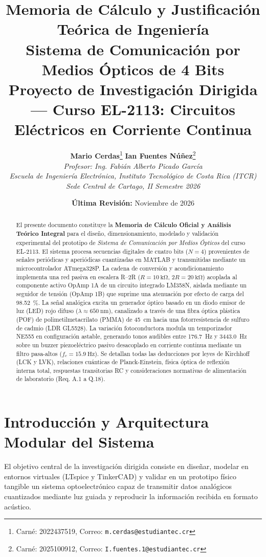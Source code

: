 \documentclass[11pt,letterpaper]{article}
\title{
    \vspace{-1.0cm}
    \Huge \textbf{\textcolor{tecblue}{Memoria de Cálculo y Justificación Teórica de Ingeniería}}\\[0.3cm]
    \Large \textbf{Sistema de Comunicación por Medios Ópticos de 4 Bits}\\[0.2cm]
    \large Proyecto de Investigación Dirigida --- Curso EL-2113: Circuitos Eléctricos en Corriente Continua
}
\author{
    \textbf{Mario Cerdas}\footnote{Carné: 2022437519, Correo: \texttt{m.cerdas@estudiantec.cr}} \quad
    \textbf{Ian Fuentes Núñez}\footnote{Carné: 2025100912, Correo: \texttt{I.fuentes.1@estudiantec.cr}}\\[0.3cm]
    \textit{Profesor: Ing. Fabián Alberto Picado García}\\[0.1cm]
    \textit{Escuela de Ingeniería Electrónica, Instituto Tecnológico de Costa Rica (ITCR)}\\
    \textit{Sede Central de Cartago, II Semestre 2026}
}
\date{\textbf{Última Revisión:} Noviembre de 2026}
\begin{document}
\maketitle
\thispagestyle{empty}

\begin{abstract}
\noindent El presente documento constituye la \textbf{Memoria de Cálculo Oficial y Análisis Teórico Integral} para el diseño, dimensionamiento, modelado y validación experimental del prototipo de \emph{Sistema de Comunicación por Medios Ópticos} del curso EL-2113. El sistema procesa secuencias digitales de cuatro bits ($N=4$) provenientes de señales periódicas y aperiódicas cuantizadas en MATLAB y transmitidas mediante un microcontrolador ATmega328P. La cadena de conversión y acondicionamiento implementa una red pasiva en escalera R--2R ($R=\SI{10}{\kilo\ohm}$, $2R=\SI{20}{\kilo\ohm}$) acoplada al componente activo OpAmp 1A de un circuito integrado LM358N, aislada mediante un seguidor de tensión (OpAmp 1B) que suprime una atenuación por efecto de carga del \SI{98.52}{\percent}. La señal analógica excita un generador óptico basado en un diodo emisor de luz (LED) rojo difuso ($\lambda \approx \SI{650}{\nano\meter}$), canalizado a través de una fibra óptica plástica (POF) de polimetilmetacrilato (PMMA) de \SI{45}{\centi\meter} hacia una fotorresistencia de sulfuro de cadmio (LDR GL5528). La variación fotoconductora modula un temporizador NE555 en configuración astable, generando tonos audibles entre \SI{176.7}{\hertz} y \SI{3443.0}{\hertz} sobre un buzzer piezoeléctrico pasivo desacoplado en corriente continua mediante un filtro pasa-altos ($f_c = \SI{15.9}{\hertz}$). Se detallan todas las deducciones por leyes de Kirchhoff (LCK y LVK), relaciones cuánticas de Planck-Einstein, física óptica de reflexión interna total, respuestas transitorias RC y consideraciones normativas de alimentación de laboratorio (Req. A.1 a Q.18).
\end{abstract}

\vspace{0.5cm}
\tableofcontents
\newpage

\section{Introducción y Arquitectura Modular del Sistema}

El objetivo central de la investigación dirigida consiste en diseñar, modelar en entornos virtuales (LTspice y TinkerCAD) y validar en un prototipo físico tangible un sistema optoelectrónico capaz de transmitir datos analógicos cuantizados mediante luz guiada y reproducir la información recibida en formato acústico. 
\end{document}
